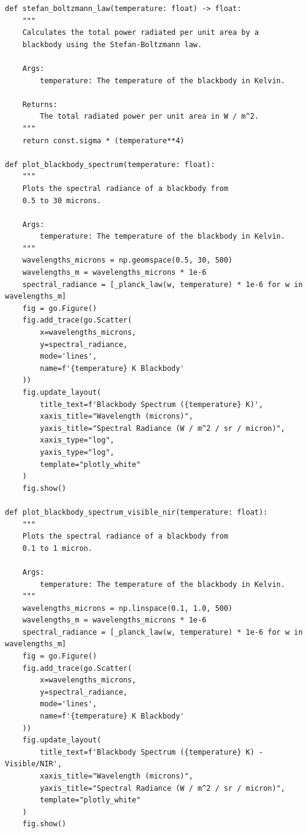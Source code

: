 \documentclass[11pt]{article}
\begin{document}
\begin{Verbatim}
def stefan_boltzmann_law(temperature: float) -> float:
    """
    Calculates the total power radiated per unit area by a
    blackbody using the Stefan-Boltzmann law.

    Args:
        temperature: The temperature of the blackbody in Kelvin.

    Returns:
        The total radiated power per unit area in W / m^2.
    """
    return const.sigma * (temperature**4)

def plot_blackbody_spectrum(temperature: float):
    """
    Plots the spectral radiance of a blackbody from
    0.5 to 30 microns.

    Args:
        temperature: The temperature of the blackbody in Kelvin.
    """
    wavelengths_microns = np.geomspace(0.5, 30, 500)
    wavelengths_m = wavelengths_microns * 1e-6
    spectral_radiance = [_planck_law(w, temperature) * 1e-6 for w in wavelengths_m]
    fig = go.Figure()
    fig.add_trace(go.Scatter(
        x=wavelengths_microns,
        y=spectral_radiance,
        mode='lines',
        name=f'{temperature} K Blackbody'
    ))
    fig.update_layout(
        title_text=f'Blackbody Spectrum ({temperature} K)',
        xaxis_title="Wavelength (microns)",
        yaxis_title="Spectral Radiance (W / m^2 / sr / micron)",
        xaxis_type="log",
        yaxis_type="log",
        template="plotly_white"
    )
    fig.show()

def plot_blackbody_spectrum_visible_nir(temperature: float):
    """
    Plots the spectral radiance of a blackbody from
    0.1 to 1 micron.

    Args:
        temperature: The temperature of the blackbody in Kelvin.
    """
    wavelengths_microns = np.linspace(0.1, 1.0, 500)
    wavelengths_m = wavelengths_microns * 1e-6
    spectral_radiance = [_planck_law(w, temperature) * 1e-6 for w in wavelengths_m]
    fig = go.Figure()
    fig.add_trace(go.Scatter(
        x=wavelengths_microns,
        y=spectral_radiance,
        mode='lines',
        name=f'{temperature} K Blackbody'
    ))
    fig.update_layout(
        title_text=f'Blackbody Spectrum ({temperature} K) - Visible/NIR',
        xaxis_title="Wavelength (microns)",
        yaxis_title="Spectral Radiance (W / m^2 / sr / micron)",
        template="plotly_white"
    )
    fig.show()
\end{Verbatim}
\end{document}
